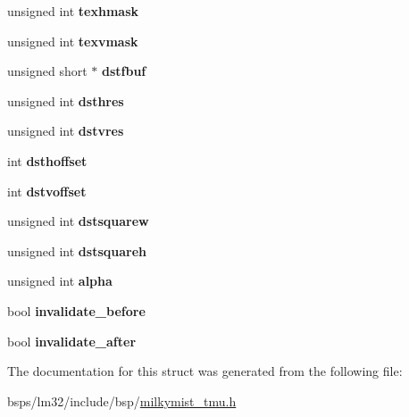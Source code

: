 \begin{DoxyCompactItemize}
unsigned int {\bfseries texhmask}
\item 
\mbox{\label{structtmu__td_af375033e7baed5229215987a53be3c71}} 
unsigned int {\bfseries texvmask}
\item 
\mbox{\label{structtmu__td_a71c60867b5abd4fa5269ce88f47eb305}} 
unsigned short $\ast$ {\bfseries dstfbuf}
\item 
\mbox{\label{structtmu__td_a9aeb733313dbe330b959826558f09d3d}} 
unsigned int {\bfseries dsthres}
\item 
\mbox{\label{structtmu__td_a12348f6fe626d8ace24af95f36362cea}} 
unsigned int {\bfseries dstvres}
\item 
\mbox{\label{structtmu__td_adbb7f771a1718273fc2d1804ce540149}} 
int {\bfseries dsthoffset}
\item 
\mbox{\label{structtmu__td_a8f7244e48740f81bbb81a9323d4bfc60}} 
int {\bfseries dstvoffset}
\item 
\mbox{\label{structtmu__td_a98cb518a9835ae3e7db030298d162ea0}} 
unsigned int {\bfseries dstsquarew}
\item 
\mbox{\label{structtmu__td_a746c681e7cbc2ac67b082d656b00a2e9}} 
unsigned int {\bfseries dstsquareh}
\item 
\mbox{\label{structtmu__td_ab6178d6aaa777f72e2e43f10bc9ba7a4}} 
unsigned int {\bfseries alpha}
\item 
\mbox{\label{structtmu__td_a73ca4c0a762f5326a3672ade2beea0bd}} 
bool {\bfseries invalidate\+\_\+before}
\item 
\mbox{\label{structtmu__td_a8a904ac858731d6eaebce0eeea29ae01}} 
bool {\bfseries invalidate\+\_\+after}
\end{DoxyCompactItemize}


The documentation for this struct was generated from the following file\+:\begin{DoxyCompactItemize}
\item 
bsps/lm32/include/bsp/\mbox{\hyperlink{milkymist__tmu_8h}{milkymist\+\_\+tmu.\+h}}\end{DoxyCompactItemize}
